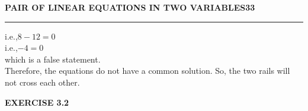\documentclass[12pt]{article}
\begin{document}
\noindent\textcolor{cyanblue}{\textbf{PAIR OF LINEAR EQUATIONS IN TWO VARIABLES}}\hfill\textcolor{cyanblue}{\textbf{33}}\\[-0.5em]
\textcolor{cyanblue}{\rule{\textwidth}{0.8pt}}

\vspace{1em}

\noindent
i.e.,\quad $8 - 12 = 0$ \\
i.e.,\quad $-4 = 0$ \\
which is a false statement. \\
Therefore, the equations do not have a common solution. So, the two rails will not cross each other.

\vspace{1em}

\begin{center}
    \textcolor{cyanblue}{\textbf{EXERCISE 3.2}}
\end{center}
\end{document}
